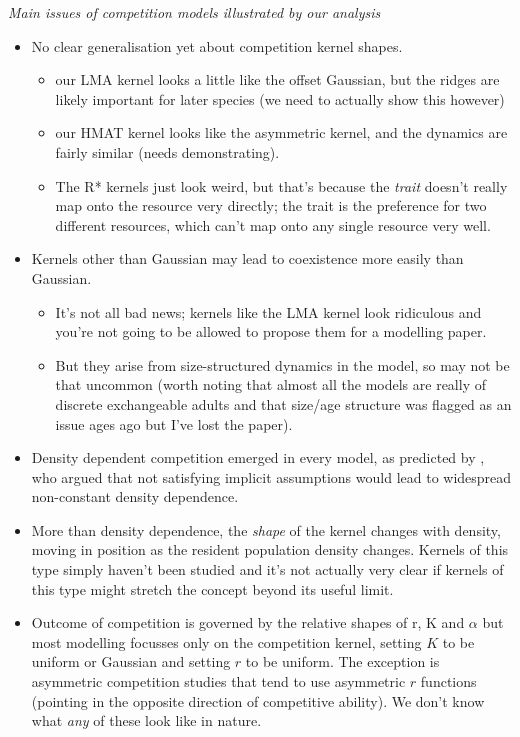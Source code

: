 \documentclass[a4paper,11pt]{article}
\begin{document}
\textit{Main issues of competition models illustrated by our analysis}
\begin{itemize}
\item No clear generalisation yet about competition kernel shapes.
  \begin{itemize}
  \item our LMA kernel looks a little like the
    \citet{Roughgarden-1979} offset Gaussian, but the ridges are
    likely important for later species (we need to actually show this
    however)
  \item our HMAT kernel looks like the \citet{Kisdi-1999} asymmetric
    kernel, and the dynamics are fairly similar (needs
    demonstrating).
  \item The R* kernels just look weird, but that's because the
    \emph{trait} doesn't really map onto the resource very directly;
    the trait is the preference for two different resources, which
    can't map onto any single resource very well.
  \end{itemize}
\item Kernels other than Gaussian may lead to coexistence more easily
  than Gaussian.
  \begin{itemize}
  \item It's not all bad news; kernels like the LMA kernel look
    ridiculous and you're not going to be allowed to propose them for
    a modelling paper.
  \item But they arise from size-structured dynamics in the model, so
    may not be that uncommon (worth noting that almost all the models
    are really of discrete exchangeable adults and that size/age
    structure was flagged as an issue ages ago but I've lost the
    paper).
  \end{itemize}
\item Density dependent competition emerged in every model, as
  predicted by \citet{Abrams-1980}, who argued that not satisfying
  implicit assumptions would lead to widespread non-constant density
  dependence.
\item More than density dependence, the \emph{shape} of the kernel
  changes with density, moving in position as the resident population
  density changes.  Kernels of this type simply haven't been studied
  and it's not actually very clear if kernels of this type might
  stretch the concept beyond its useful limit.
\item Outcome of competition is governed by the relative shapes of r,
  K and $\alpha$ but most modelling focusses only on the competition
  kernel, setting $K$ to be uniform or Gaussian and setting $r$ to be
  uniform.  The exception is asymmetric competition studies that tend
  to use asymmetric $r$ functions (pointing in the opposite direction
  of competitive ability). We don't know what \emph{any} of these look
  like in nature.
\end{itemize}
\end{document}
